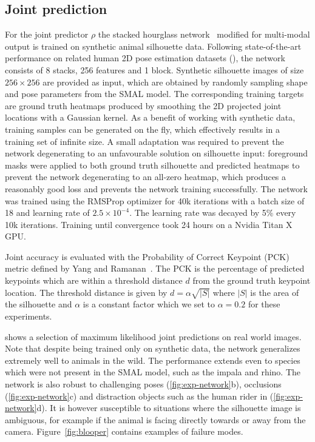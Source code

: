 \subsection{Joint prediction}
\label{sec:exp-network}
For the joint predictor $\rho$ the stacked hourglass network~\cite{newell2016stacked} modified for multi-modal output is trained on synthetic animal silhouette data. Following state-of-the-art performance on related human 2D pose estimation datasets (\cite{andriluka14cvpr,lin2014microsoft}), the network consists of 8 stacks, 256 features and 1 block. Synthetic silhouette images of size $256\times 256$ are provided as input, which are obtained by randomly sampling shape and pose parameters from the SMAL model. The corresponding training targets are ground truth heatmaps produced by smoothing the 2D projected joint locations with a Gaussian kernel. As a benefit of working with synthetic data, training samples can be generated on the fly, which effectively results in a training set of infinite size. A small adaptation was required to prevent the network degenerating to an unfavourable solution on silhouette input: foreground masks were applied to both ground truth silhouette and predicted heatmaps to prevent the network degenerating to an all-zero heatmap, which produces a reasonably good loss and prevents the network training successfully. The network was trained using the RMSProp optimizer for 40k iterations with a batch size of 18 and learning rate of $2.5\times 10^{-4}$. The learning rate was decayed by 5\% every 10k iterations. Training until convergence took 24 hours on a Nvidia Titan X GPU.

Joint accuracy is evaluated with the Probability of Correct Keypoint (PCK) metric defined by Yang and Ramanan~\cite{yang2013articulated}. The PCK is the percentage of predicted keypoints which are within a threshold distance $d$ from the ground truth keypoint location. The threshold distance is given by $d=\alpha\sqrt{|S|}$ where $|S|$ is the area of the silhouette and $\alpha$ is a constant factor which we set to $\alpha=0.2$ for these experiments.

 shows a selection of maximum likelihood joint predictions on real world images. Note that despite being trained only on synthetic data, the network generalizes extremely well to animals in the wild. The performance extends even to species which were not present in the SMAL model, such as the impala and rhino. The network is also robust to challenging poses (\ref{fig:exp-network}b), occlusions (\ref{fig:exp-network}c) and distraction objects such as the human rider in (\ref{fig:exp-network}d). It is however susceptible to situations where the silhouette image is ambiguous, for example if the animal is facing directly towards or away from the camera. Figure~\ref{fig:blooper} contains examples of failure modes.

